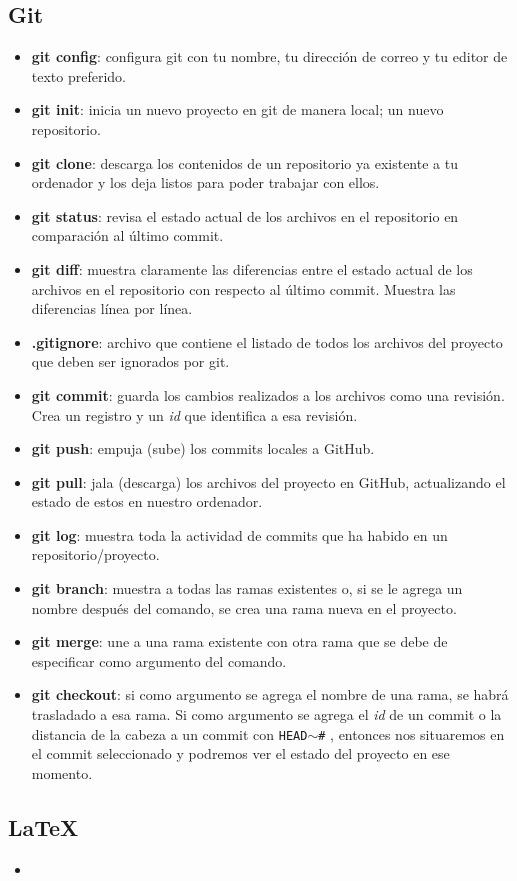 \documentclass[10pt,letterpaper]{article}
\newcommand{\inlinecode}[1]{
\colorbox{light-gray}{\texttt{#1}}
}
\begin{document}
\subsection{Git}
\begin{small}
\begin{itemize}
\item \textbf{git config}: configura git con tu nombre, tu direcci\'on de correo y tu editor de texto preferido.
\item \textbf{git init}: inicia un nuevo proyecto en git de manera local; un nuevo repositorio.
\item \textbf{git clone}: descarga los contenidos de un repositorio ya existente a tu ordenador y los deja listos para poder trabajar con ellos.
\item \textbf{git status}: revisa el estado actual de los archivos en el repositorio en comparaci\'on al \'ultimo commit.
\item \textbf{git diff}: muestra claramente las diferencias entre el estado actual de los archivos en el repositorio con respecto al \'ultimo commit. Muestra las diferencias l\'inea por l\'inea.
\item \textbf{.gitignore}: archivo que contiene el listado de todos los archivos del proyecto que deben ser ignorados por git.
\item \textbf{git commit}: guarda los cambios realizados a los archivos como una revisi\'on. Crea un registro y un \emph{id} que identifica a esa revisi\'on.
\item \textbf{git push}: empuja (sube) los commits locales a GitHub.
\item \textbf{git pull}: jala (descarga) los archivos del proyecto en GitHub, actualizando el estado de estos en nuestro ordenador.
\item \textbf{git log}: muestra toda la actividad de commits que ha habido en un repositorio/proyecto.
\item \textbf{git branch}: muestra a todas las ramas existentes o, si se le agrega un nombre despu\'es del comando, se crea una rama nueva en el proyecto.
\item \textbf{git merge}: une a una rama existente con otra rama que se debe de especificar como argumento del comando.
\item \textbf{git checkout}: si como argumento se agrega el nombre de una rama, se habr\'a trasladado a esa rama. Si como argumento se agrega el \emph{id} de un commit o la distancia de la cabeza a un commit con \inlinecode{HEAD$\sim$\#}, entonces nos situaremos en el commit seleccionado y podremos ver el estado del proyecto en ese momento.
\end{itemize}
\end{small}

\subsection{\LaTeX\ }
\begin{small}
\begin{itemize}
\item 
\end{itemize}
\end{small}
\end{document}

